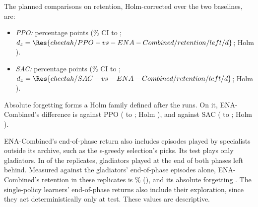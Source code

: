 The planned comparisons on retention, Holm-corrected over the two baselines, are:
\begin{itemize}
  \item \textit{PPO:}  percentage points (\% CI  to ; $d_z = \Res{cheetah/PPO-vs-ENA-Combined/retention/left/d}$; Holm ).
  \item \textit{SAC:}  percentage points (\% CI  to ; $d_z = \Res{cheetah/SAC-vs-ENA-Combined/retention/left/d}$; Holm ).
\end{itemize}
Absolute forgetting forms a Holm family defined after the runs. On it, ENA-Combined's difference is  against PPO ( to ; Holm ), and  against SAC ( to ; Holm ).

ENA-Combined's end-of-phase return also includes episodes played by specialists outside its archive, such as the $\epsilon$-greedy selection's picks. Its test plays only gladiators. In  of the  replicates, gladiators played at the end of both phases left behind. Measured against the gladiators' end-of-phase episodes alone, ENA-Combined's retention in these replicates is \% (), and its absolute forgetting . The single-policy learners' end-of-phase returns also include their exploration, since they act deterministically only at test. These values are descriptive.

